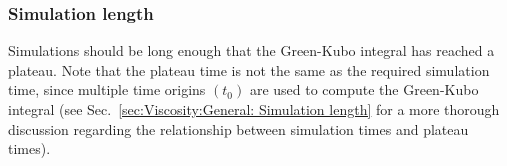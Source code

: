 \documentclass[9pt,bestpractices]{livecoms}
\begin{document}
\subsubsection{Simulation length} \label{sec:Self-Diffusivity:Green-Kubo: Simulation length}

Simulations should be long enough that the Green-Kubo integral has reached a plateau. Note that the plateau time is not the same as the required simulation time, since multiple time origins $(t_0)$ are used to compute the Green-Kubo integral (see Sec.\ \ref{sec:Viscosity:General: Simulation length} for a more thorough discussion regarding the relationship between simulation times and plateau times).


\end{document}
